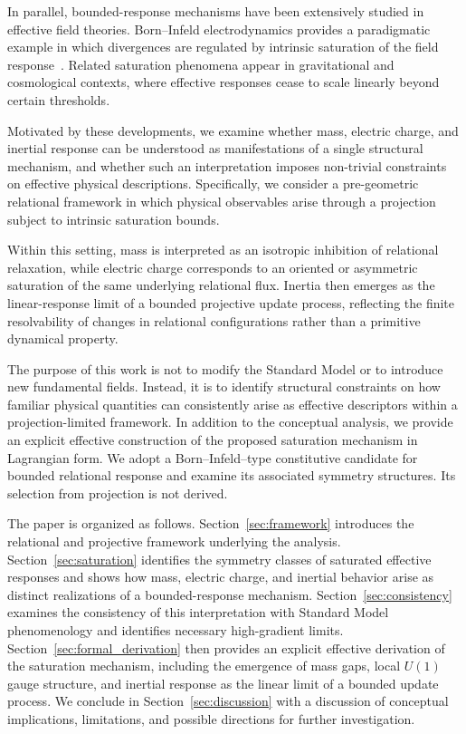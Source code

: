 \documentclass[pdflatex,sn-mathphys-num]{sn-jnl} %
\theoremstyle{remark}
\begin{document}
    In parallel, bounded-response mechanisms have been extensively studied in
    effective field theories.
    Born--Infeld electrodynamics provides a paradigmatic example in which divergences
    are regulated by intrinsic saturation of the field
    response~\cite{BornInfeld1934}.
    Related saturation phenomena appear in gravitational and cosmological contexts,
    where effective responses cease to scale linearly beyond certain thresholds.

    Motivated by these developments, we examine whether mass, electric charge, and
    inertial response can be understood as manifestations of a single structural
    mechanism, and whether such an interpretation imposes non-trivial constraints on
    effective physical descriptions.
    Specifically, we consider a pre-geometric relational framework in which physical
    observables arise through a projection subject to intrinsic saturation bounds.

    Within this setting, mass is interpreted as an isotropic inhibition of
    relational relaxation, while electric charge corresponds to an oriented or
    asymmetric saturation of the same underlying relational flux.
    Inertia then emerges as the linear-response limit of a bounded projective update
    process, reflecting the finite resolvability of changes in relational
    configurations rather than a primitive dynamical property.

    The purpose of this work is not to modify the Standard Model or to introduce new
    fundamental fields.
    Instead, it is to identify structural constraints on how familiar physical
    quantities can consistently arise as effective descriptors within a
    projection-limited framework.
    In addition to the conceptual analysis, we provide an explicit effective
    construction of the proposed saturation mechanism in Lagrangian form.
    We adopt a Born--Infeld--type constitutive candidate for bounded relational response
    and examine its associated symmetry structures.
    Its selection from projection is not derived.

    The paper is organized as follows.
    Section~\ref{sec:framework} introduces the relational and projective framework
    underlying the analysis.
    Section~\ref{sec:saturation} identifies the symmetry classes of saturated
    effective responses and shows how mass, electric charge, and inertial behavior
    arise as distinct realizations of a bounded-response mechanism.
    Section~\ref{sec:consistency} examines the consistency of this interpretation with
    Standard Model phenomenology and identifies necessary high-gradient limits.
    Section~\ref{sec:formal_derivation} then provides an explicit effective derivation
    of the saturation mechanism, including the emergence of mass gaps, local $U(1)$
    gauge structure, and inertial response as the linear limit of a bounded update
    process.
    We conclude in Section~\ref{sec:discussion} with a discussion of conceptual
    implications, limitations, and possible directions for further investigation.
\end{document}
